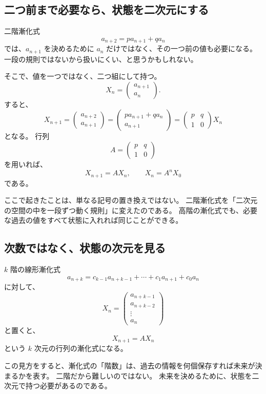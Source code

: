 \subsection{二つ前まで必要なら、状態を二次元にする}

二階漸化式
\[
  a_{n+2}=p a_{n+1}+q a_n
\]
では、$a_{n+1}$ を決めるために $a_n$ だけではなく、その一つ前の値も必要になる。
一段の規則ではないから扱いにくい、と思うかもしれない。

そこで、値を一つではなく、二つ組にして持つ。
\[
  X_n=
  \begin{pmatrix}
    a_{n+1}\\
    a_n
  \end{pmatrix}.
\]
すると、
\[
  X_{n+1}
  =
  \begin{pmatrix}
    a_{n+2}\\
    a_{n+1}
  \end{pmatrix}
  =
  \begin{pmatrix}
    p a_{n+1}+q a_n\\
    a_{n+1}
  \end{pmatrix}
  =
  \begin{pmatrix}
    p&q\\
    1&0
  \end{pmatrix}
  X_n
\]
となる。
行列
\[
  A=
  \begin{pmatrix}
    p&q\\
    1&0
  \end{pmatrix}
\]
を用いれば、
\[
  X_{n+1}=AX_n,\qquad X_n=A^nX_0
\]
である。

ここで起きたことは、単なる記号の置き換えではない。
二階漸化式を「二次元の空間の中を一段ずつ動く規則」に変えたのである。
高階の漸化式でも、必要な過去の値をすべて状態に入れれば同じことができる。

\subsection{次数ではなく、状態の次元を見る}

$k$ 階の線形漸化式
\[
  a_{n+k}=c_{k-1}a_{n+k-1}+\cdots+c_1a_{n+1}+c_0a_n
\]
に対して、
\[
  X_n=
  \begin{pmatrix}
    a_{n+k-1}\\
    a_{n+k-2}\\
    \vdots\\
    a_n
  \end{pmatrix}
\]
と置くと、
\[
  X_{n+1}=AX_n
\]
という $k$ 次元の行列の漸化式になる。

この見方をすると、漸化式の「階数」は、過去の情報を何個保存すれば未来が決まるかを表す。
二階だから難しいのではない。
未来を決めるために、状態を二次元で持つ必要があるのである。

